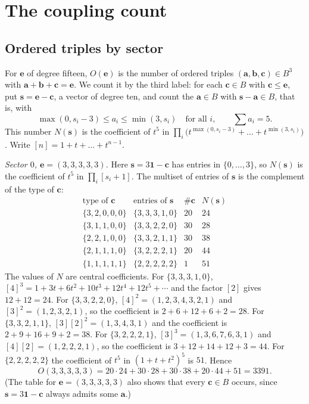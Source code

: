 \documentclass[11pt]{amsart}
\theoremstyle{definition}
\theoremstyle{remark}
\newcommand{\bb}{\mathbf{b}}
\newcommand{\cc}{\mathbf{c}}
\newcommand{\va}{\mathbf{a}}
\newcommand{\ee}{\mathbf{e}}
\newcommand{\one}{\mathbf{1}}
\begin{document}
\section{The coupling count}\label{app:count}

\subsection{Ordered triples by sector}

For $\ee$ of degree fifteen, $O(\ee)$ is the number of ordered triples
$(\va,\bb,\cc)\in B^3$ with $\va+\bb+\cc=\ee$. We count it by the third
label: for each $\cc\in B$ with $\cc\le\ee$, put $\mathbf s=\ee-\cc$, a
vector of degree ten, and count the $\va\in B$ with $\mathbf s-\va\in B$,
that is, with
\[
\max(0,s_i-3)\le a_i\le\min(3,s_i)\quad\text{for all }i,\qquad
\textstyle\sum a_i=5.
\]
This number $N(\mathbf s)$ is the coefficient of $t^5$ in
$\prod_i\big(t^{\max(0,s_i-3)}+\dots+t^{\min(3,s_i)}\big)$. Write
$[n]=1+t+\dots+t^{n-1}$.

\emph{Sector $0$, $\ee=(3,3,3,3,3)$.} Here $\mathbf s=3\one-\cc$ has
entries in $\{0,\dots,3\}$, so $N(\mathbf s)$ is the coefficient of $t^5$ in
$\prod_i[s_i+1]$. The multiset of entries of $\mathbf s$ is the complement
of the type of $\cc$:
\[
\begin{array}{l|l|r|r}
\text{type of }\cc&\text{entries of }\mathbf s&\#\cc&N(\mathbf s)\\\hline
\{3,2,0,0,0\}&\{3,3,3,1,0\}&20&24\\
\{3,1,1,0,0\}&\{3,3,2,2,0\}&30&28\\
\{2,2,1,0,0\}&\{3,3,2,1,1\}&30&38\\
\{2,1,1,1,0\}&\{3,2,2,2,1\}&20&44\\
\{1,1,1,1,1\}&\{2,2,2,2,2\}&1&51
\end{array}
\]
The values of $N$ are central coefficients. For $\{3,3,3,1,0\}$,
$[4]^3=1+3t+6t^2+10t^3+12t^4+12t^5+\cdots$ and the factor $[2]$ gives
$12+12=24$. For $\{3,3,2,2,0\}$, $[4]^2=(1,2,3,4,3,2,1)$ and
$[3]^2=(1,2,3,2,1)$, so the coefficient is $2+6+12+6+2=28$. For
$\{3,3,2,1,1\}$, $[3][2]^2=(1,3,4,3,1)$ and the coefficient is
$2+9+16+9+2=38$. For $\{3,2,2,2,1\}$, $[3]^3=(1,3,6,7,6,3,1)$ and
$[4][2]=(1,2,2,2,1)$, so the coefficient is $3+12+14+12+3=44$. For
$\{2,2,2,2,2\}$ the coefficient of $t^5$ in $(1+t+t^2)^5$ is $51$. Hence
\[
O(3,3,3,3,3)=20\cdot24+30\cdot28+30\cdot38+20\cdot44+51=3391.
\]
(The table for $\ee=(3,3,3,3,3)$ also shows that every $\cc\in B$ occurs,
since $\mathbf s=3\one-\cc$ always admits some $\va$.)
\end{document}
